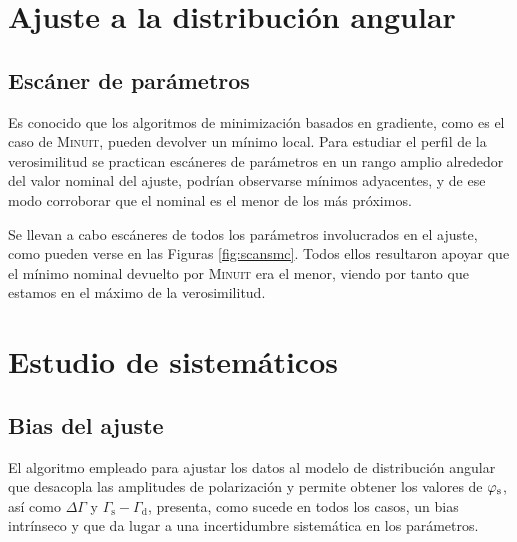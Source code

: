 \section{Ajuste a la distribución angular}


\subsection{Escáner de parámetros}

Es conocido que los algoritmos de minimización basados en gradiente, como es el caso de \textsc{Minuit}, pueden devolver un mínimo local. Para estudiar el perfil de la verosimilitud se practican escáneres de parámetros en un rango amplio alrededor del valor nominal del ajuste, podrían observarse mínimos adyacentes, y de ese modo corroborar que el nominal es el menor de los más próximos.

Se llevan a cabo escáneres de todos los parámetros involucrados en el ajuste, como pueden verse en las Figuras \ref{fig:scansmc}. Todos ellos resultaron apoyar que el mínimo nominal devuelto por \textsc{Minuit} era el menor, viendo por tanto que estamos en el máximo de la verosimilitud.









\section{Estudio de sistemáticos}

\subsection{Bias del ajuste}
\label{sec:fitbias}

El algoritmo empleado para ajustar los datos al modelo de distribución angular que desacopla las amplitudes de polarización y permite obtener los valores de $\varphi_{\text{s}}$, así como $\Delta \Gamma$ y $\Gamma_{\text{s}} - \Gamma_{\text{d}}$, presenta, como sucede en todos los casos, un bias intrínseco y que da lugar a una incertidumbre sistemática en los parámetros.


